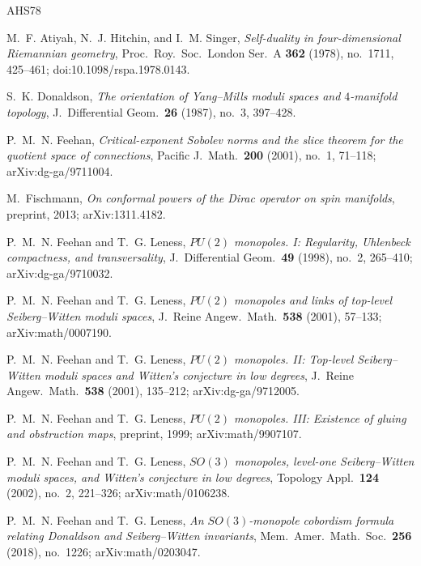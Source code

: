 \documentclass[11pt]{amsart}
\theoremstyle{definition}
\theoremstyle{remark}
\theoremstyle{plain}
\begin{document}
\begin{thebibliography}{AHS78}

 M.~F. Atiyah, N.~J. Hitchin, and I.~M. Singer,
\emph{Self-duality in four-dimensional Riemannian geometry},
Proc.\ Roy.\ Soc.\ London Ser.\ A \textbf{362} (1978), no.~1711,
425--461; doi:10.1098/rspa.1978.0143.

 S.~K. Donaldson,
\emph{The orientation of Yang--Mills moduli spaces and $4$-manifold
topology}, J.\ Differential Geom.\ \textbf{26} (1987), no.~3, 397--428.

 P.~M.~N. Feehan,
\emph{Critical-exponent Sobolev norms and the slice theorem for the quotient
space of connections}, Pacific J.\ Math.\ \textbf{200} (2001), no.~1,
71--118; arXiv:dg-ga/9711004.

 M.~Fischmann,
\emph{On conformal powers of the Dirac operator on spin manifolds},
preprint, 2013; arXiv:1311.4182.

 P.~M.~N. Feehan and T.~G. Leness,
\emph{$PU(2)$ monopoles. I: Regularity, Uhlenbeck compactness, and
transversality}, J.\ Differential Geom.\ \textbf{49} (1998), no.~2,
265--410; arXiv:dg-ga/9710032.

 P.~M.~N. Feehan and T.~G. Leness,
\emph{$PU(2)$ monopoles and links of top-level Seiberg--Witten moduli
spaces}, J.\ Reine Angew.\ Math.\ \textbf{538} (2001), 57--133;
arXiv:math/0007190.

 P.~M.~N. Feehan and T.~G. Leness,
\emph{$PU(2)$ monopoles. II: Top-level Seiberg--Witten moduli spaces and
Witten's conjecture in low degrees}, J.\ Reine Angew.\ Math.\ \textbf{538}
(2001), 135--212; arXiv:dg-ga/9712005.

 P.~M.~N. Feehan and T.~G. Leness,
\emph{$PU(2)$ monopoles. III: Existence of gluing and obstruction maps},
preprint, 1999; arXiv:math/9907107.

 P.~M.~N. Feehan and T.~G. Leness,
\emph{$SO(3)$ monopoles, level-one Seiberg--Witten moduli spaces, and
Witten's conjecture in low degrees}, Topology Appl.\ \textbf{124} (2002),
no.~2, 221--326; arXiv:math/0106238.

 P.~M.~N. Feehan and T.~G. Leness,
\emph{An $SO(3)$-monopole cobordism formula relating Donaldson and
Seiberg--Witten invariants}, Mem.\ Amer.\ Math.\ Soc.\ \textbf{256} (2018),
no.~1226; arXiv:math/0203047.


\end{thebibliography}
\end{document}

